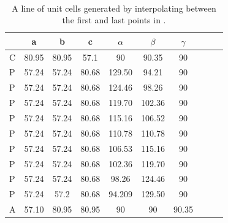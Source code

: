 \documentclass[preprint]{iucr}              %
\numberwithin{equation}{section}
\numberwithin{equation}{section}
\begin{document}
			
	\begin{table}
		\begin{center}
			\caption{A line of unit cells generated by interpolating 
				between the first and last points in \SVI.}
			~~\\
					
			\begin{tabular}{lccccccccc}
				\toprule
				&a&b&c&$\alpha$&$\beta$&$\gamma$ \\ \midrule
				C & 80.95    &  80.95  & 57.1    &  90      &  90.35   & 90    \\  
				P & 57.24 &57.24 &80.68 &129.50 &94.21   &90     \\  
				P & 57.24 &57.24 &80.68 &124.46 &98.26  & 90    \\  
				P & 57.24 &57.24 &80.68 &119.70 &102.36 &90     \\  
				P & 57.24 &57.24 &80.68 &115.16 &106.52 &90     \\  
				P & 57.24 &57.24 &80.68 &110.78 &110.78 &90     \\  
				P & 57.24 &57.24 &80.68 &106.53 &115.16 &90     \\  
				P & 57.24 &57.24 &80.68 &102.36 &119.70 &90     \\ 
				P & 57.24 &57.24 &80.68 &98.26  &124.46 &90     \\  
				P & 57.24 &57.2& 80.68 &94.209   &129.50 &90  \\ 
				A &  57.10 & 80.95 & 80.95 & 90 & 90 & 90.35		\\	 
				\bottomrule
			\end{tabular}			
			\label{table:AD1}
		\end{center}
	\end{table}	
	
\end{document}
